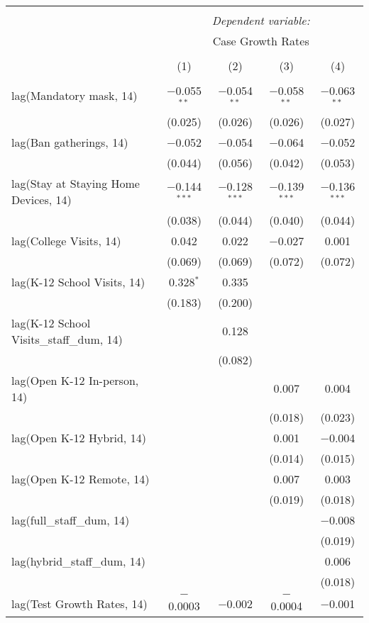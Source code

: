 \begin{tabular}{@{\extracolsep{1pt}}lcccc} 
\\[-1.8ex]\hline 
\hline \\[-1.8ex] 
 & \multicolumn{4}{c}{\textit{Dependent variable:}} \\ 
\cline{2-5} 
 & \multicolumn{4}{c}{Case Growth Rates} \\ 
\\[-1.8ex] & (1) & (2) & (3) & (4)\\ 
\hline \\[-1.8ex] 
 lag(Mandatory mask, 14) & $-$0.055$^{**}$ & $-$0.054$^{**}$ & $-$0.058$^{**}$ & $-$0.063$^{**}$ \\ 
  & (0.025) & (0.026) & (0.026) & (0.027) \\ 
  lag(Ban gatherings, 14) & $-$0.052 & $-$0.054 & $-$0.064 & $-$0.052 \\ 
  & (0.044) & (0.056) & (0.042) & (0.053) \\ 
  lag(Stay at Staying Home Devices, 14) & $-$0.144$^{***}$ & $-$0.128$^{***}$ & $-$0.139$^{***}$ & $-$0.136$^{***}$ \\ 
  & (0.038) & (0.044) & (0.040) & (0.044) \\ 
  lag(College Visits, 14) & 0.042 & 0.022 & $-$0.027 & 0.001 \\ 
  & (0.069) & (0.069) & (0.072) & (0.072) \\ 
  lag(K-12 School Visits, 14) & 0.328$^{*}$ & 0.335 &  &  \\ 
  & (0.183) & (0.200) &  &  \\ 
  lag(K-12 School Visits\_staff\_dum, 14) &  & 0.128 &  &  \\ 
  &  & (0.082) &  &  \\ 
  lag(Open K-12 In-person, 14) &  &  & 0.007 & 0.004 \\ 
  &  &  & (0.018) & (0.023) \\ 
  lag(Open K-12 Hybrid, 14) &  &  & 0.001 & $-$0.004 \\ 
  &  &  & (0.014) & (0.015) \\ 
  lag(Open K-12 Remote, 14) &  &  & 0.007 & 0.003 \\ 
  &  &  & (0.019) & (0.018) \\ 
  lag(full\_staff\_dum, 14) &  &  &  & $-$0.008 \\ 
  &  &  &  & (0.019) \\ 
  lag(hybrid\_staff\_dum, 14) &  &  &  & 0.006 \\ 
  &  &  &  & (0.018) \\ 
  lag(Test Growth Rates, 14) & $-$0.0003 & $-$0.002 & $-$0.0004 & $-$0.001 \\ 

\end{tabular}
